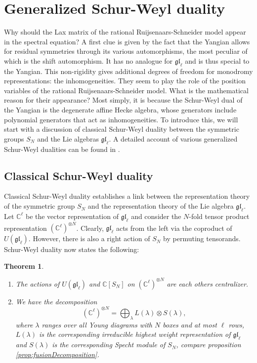 \documentclass[11pt]{report}
\newtheorem{theorem}{Theorem}[section]
\theoremstyle{definition}
\theoremstyle{remark}
\theoremstyle{remark}
\newcommand{\C}{\mathbb{C}}
\begin{document}
\section{Generalized Schur-Weyl duality}

Why should the Lax matrix of the rational Ruijsenaars-Schneider model appear in the spectral equation? A first clue is given by the fact that the Yangian allows for residual symmetries through its various automorphisms, the most peculiar of which is the shift automorphism. It has no analogue for $\mathfrak{gl}_\ell$ and is thus special to the Yangian. This non-rigidity gives additional degrees of freedom for monodromy representations: the inhomogeneities. They seem to play the role of the position variables of the rational Ruijsenaars-Schneider model. What is the mathematical reason for their appearance? Most simply, it is because the Schur-Weyl dual of the Yangian is the degenerate affine Hecke algebra, whose generators include polynomial generators that act as inhomogeneities. To introduce this, we will start with a discussion of classical Schur-Weyl duality between the symmetric groups $S_N$ and the Lie algebras $\mathfrak{gl}_\ell$. A detailed account of various generalized Schur-Weyl dualities can be found in \cite{thesis:antor:2020}.

\subsection{Classical Schur-Weyl duality}

Classical Schur-Weyl duality establishes a link between the representation theory of the symmetric group $S_N$ and the representation theory of the Lie algebra $\mathfrak{gl}_\ell$. Let $\C^\ell$ be the vector representation of $\mathfrak{gl}_\ell$ and consider the $N$-fold tensor product representation $(\C^\ell)^{\otimes N}$. Clearly, $\mathfrak{gl}_\ell$ acts from the left via the coproduct of $U(\mathfrak{gl}_\ell)$. However, there is also a right action of $S_N$ by permuting tensorands. Schur-Weyl duality now states the following:

\begin{theorem}
\begin{enumerate}[label=(\roman*)]
\item The actions of $U(\mathfrak{gl}_\ell)$ and $\C[S_N]$ on $(\C^\ell)^{\otimes N}$ are each others centralizer.
\item We have the decomposition
\begin{equation*}
(\C^\ell)^{\otimes N} = \bigoplus_{\lambda} L(\lambda) \otimes S(\lambda),
\end{equation*}
where $\lambda$ ranges over all Young diagrams with $N$ boxes and at most $\ell$ rows, $L(\lambda)$ is the corresponding irreducible highest weight representation of $\mathfrak{gl}_\ell$ and $S(\lambda)$ is the corresponding Specht module of $S_N$, compare proposition \ref{prop:fusionDecomposition}.
\end{enumerate}
\end{theorem}
\end{document}
